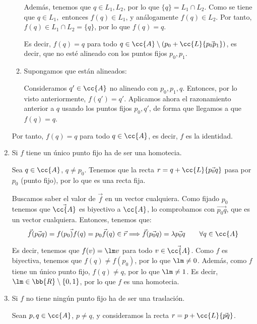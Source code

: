 \begin{ejercicio}
\begin{enumerate}
\begin{enumerate}
            Además, tenemos que $q\in L_1,L_2$, por lo que $\{q\}= L_1\cap L_2$. Como se tiene que $q\in L_1,$ entonces $f(q)\in L_1$, y análogamente $f(q)\in L_2$. Por tanto, $f(q)\in L_1\cap L_2 = \{q\}$, por lo que $f(q)=q$.
            
            Es decir, $f(q)=q$ para todo $q\in \cc{A}\setminus (p_0+\cc{L}\{\vec{p_0p_1}\})$, es decir, que no esté alineado con los puntos fijos $p_0,p_1$.

            \item Supongamos que están alineados:
            
            Consideramos $q'\in \cc{A}$ no alineado con $p_0,p_1,q$. Entonces, por lo visto anteriormente, $f(q')=q'$. Aplicamos ahora el razonamiento anterior a $q$ usando los puntos fijos $p_0,q'$, de forma que llegamos a que $f(q)=q$.
        \end{enumerate}

        Por tanto, $f(q)=q$ para todo $q\in \cc{A}$, es decir, $f$ es la identidad.
        
        \item Si $f$ tiene un único punto fijo ha de ser una homotecia.
        
        Sea $q\in \cc{A}$, $q\neq p_0$. Tenemos que la recta $r=q+\cc{L}\{\vec{p_0q}\}$ pasa por $p_0$ (punto fijo), por lo que es una recta fija.

        Buscamos saber el valor de $\vec{f}$ en un vector cualquiera. Como fijado $p_0$ tenemos que $\vec{\cc{A}}$ es biyectivo a $\cc{A}$, lo comprobamos con $\vec{p_0q}$, que es un vector cualquiera. Entonces, tenemos que:
        \begin{equation*}
            \vec{f}(\vec{p_0q}) = \vec{f(p_0)f(q)} = \vec{p_0f(q)} \in \vec{r} \Longrightarrow \vec{f}(\vec{p_0q}) = \lambda \vec{p_0q} \qquad \forall q\in \cc{A}
        \end{equation*}

        Es decir, tenemos que $f(v)=\lm v$ para todo $v\in \vec{\cc{A}}$. Como $f$ es biyectiva, tenemos que $f(q)\neq f(p_0)$, por lo que $\lm\neq 0$. Además, como $f$ tiene un único punto fijo, $f(q)\neq q$, por lo que $\lm\neq 1$. Es decir, $\lm \in \bb{R}\setminus \{0,1\}$, por lo que $f$ es una homotecia.


        \item Si $f$ no tiene ningún punto fijo ha de ser una traslación.
        
        Sean $p,q\in \cc{A}$, $p\neq q$, y consideramos la recta $r=p+\cc{L}\{\vec{pq}\}$.


\end{enumerate}
\end{ejercicio}
